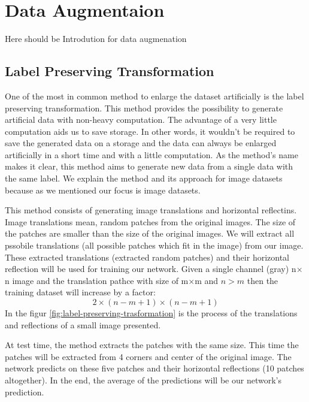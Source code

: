 \chapter{Data Augmentaion}
Here should be Introdution for data augmenation


\section{Label Preserving Transformation}
\label{tit:label-preserving}

One of the most in common method to enlarge the dataset artificially is the label preserving transformation. This method provides the possibility to generate artificial data with
non-heavy computation. The advantage of a very little computation aids us to save storage. In other
words, it wouldn't be required to save the generated data on a storage and the data can always be
enlarged artificially in a short time and with a little computation. As the method's name makes it
clear, this method aims to generate new data from a single data with the same label. We explain the method and its approach for image datasets because as we mentioned our focus is image datasets.

This method consists of generating image translations and horizontal reflectins. Image translations mean, random patches from the original images. The size of the patches are smaller than the
size of the original images. We will extract all pssobile translations (all possible patches which fit in the image) from our image.
These extracted translations (extracted random patches) and their horizontal reflection will be used for training our network. Given a single channel (gray) n$\times$n image and the translation
pathce with size of m$\times$m and $n>m$ then the training dataset will increase by a factor: $$2\times(n-m+1)\times(n-m+1)$$ In the figur \ref{fig:label-preserving-trasformation} is the process of the translations
and reflections of a small image presented.

At test time, the method extracts the patches with the same size. This time the patches will be extracted from 4 corners and center of the original image. The network predicts on these
five patches and their horizontal reflections (10 patches altogether). In the end, the average
of the predictions will be our network's prediction.

